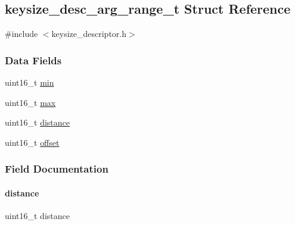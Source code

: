 \hypertarget{structkeysize__desc__arg__range__t}{}\subsection{keysize\+\_\+desc\+\_\+arg\+\_\+range\+\_\+t Struct Reference}
\label{structkeysize__desc__arg__range__t}


{\ttfamily \#include $<$keysize\+\_\+descriptor.\+h$>$}

\subsubsection*{Data Fields}
\begin{DoxyCompactItemize}
\item 
uint16\+\_\+t \hyperlink{structkeysize__desc__arg__range__t_a1a1f4624f66ab0b2eb0b98316514c369}{min}
\item 
uint16\+\_\+t \hyperlink{structkeysize__desc__arg__range__t_ac66b569507cc273bbf83ce5dd5f70e84}{max}
\item 
uint16\+\_\+t \hyperlink{structkeysize__desc__arg__range__t_a7ae9d3ad463ec7a0eb38ee23a15c51e7}{distance}
\item 
uint16\+\_\+t \hyperlink{structkeysize__desc__arg__range__t_ac681806181c80437cfab37335f62ff39}{offset}
\end{DoxyCompactItemize}


\subsubsection{Field Documentation}
\mbox{\label{structkeysize__desc__arg__range__t_a7ae9d3ad463ec7a0eb38ee23a15c51e7}} 
\paragraph{\texorpdfstring{distance}{distance}}
{\footnotesize\ttfamily uint16\+\_\+t distance}

\mbox{\label{structkeysize__desc__arg__range__t_ac66b569507cc273bbf83ce5dd5f70e84}} 
